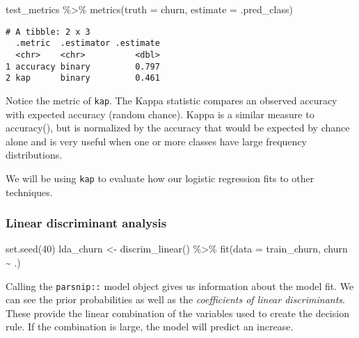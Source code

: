 \documentclass[
]{article}
\newenvironment{Shaded}{\begin{snugshade}}{\end{snugshade}}
\newcommand{\AttributeTok}[1]{\textcolor[rgb]{0.77,0.63,0.00}{#1}}
\newcommand{\DecValTok}[1]{\textcolor[rgb]{0.00,0.00,0.81}{#1}}
\newcommand{\FunctionTok}[1]{\textcolor[rgb]{0.00,0.00,0.00}{#1}}
\newcommand{\NormalTok}[1]{#1}
\newcommand{\OtherTok}[1]{\textcolor[rgb]{0.56,0.35,0.01}{#1}}
\newcommand{\SpecialCharTok}[1]{\textcolor[rgb]{0.00,0.00,0.00}{#1}}
\newcommand{\StringTok}[1]{\textcolor[rgb]{0.31,0.60,0.02}{#1}}
\begin{document}
\begin{Shaded}
\begin{Highlighting}[]
\NormalTok{test\_metrics }\SpecialCharTok{\%\textgreater{}\%}
   \FunctionTok{metrics}\NormalTok{(}\AttributeTok{truth =}\NormalTok{ churn, }\AttributeTok{estimate =}\NormalTok{ .pred\_class)}
\end{Highlighting}
\end{Shaded}

\begin{verbatim}
# A tibble: 2 x 3
  .metric  .estimator .estimate
  <chr>    <chr>          <dbl>
1 accuracy binary         0.797
2 kap      binary         0.461
\end{verbatim}

Notice the metric of \texttt{kap}. The Kappa statistic compares an
observed accuracy with expected accuracy (random chance). Kappa is a
similar measure to accuracy(), but is normalized by the accuracy that
would be expected by chance alone and is very useful when one or more
classes have large frequency distributions.

We will be using \texttt{kap} to evaluate how our logistic regression
fits to other techniques.

\hypertarget{linear-discriminant-analysis-1}{%
\subsubsection{Linear discriminant
analysis}\label{linear-discriminant-analysis-1}}

\begin{Shaded}
\begin{Highlighting}[]
\FunctionTok{set.seed}\NormalTok{(}\DecValTok{40}\NormalTok{)}
\NormalTok{lda\_churn }\OtherTok{\textless{}{-}} \FunctionTok{discrim\_linear}\NormalTok{() }\SpecialCharTok{\%\textgreater{}\%}
  \FunctionTok{fit}\NormalTok{(}\AttributeTok{data =}\NormalTok{ train\_churn, churn }\SpecialCharTok{\textasciitilde{}}\NormalTok{ .)}
\end{Highlighting}
\end{Shaded}

Calling the \texttt{parsnip::} model object gives us information about
the model fit. We can see the prior probabilities as well as the
\emph{coefficients of linear discriminants}. These provide the linear
combination of the variables used to create the decision rule. If the
combination is large, the model will predict an increase.

\begin{Shaded}
\end{Shaded}
\end{document}
